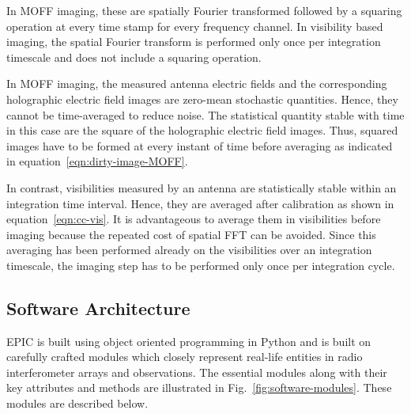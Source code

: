 \documentclass[a4paper,fleqn,usenatbib]{mnras}
\begin{document}
In MOFF imaging, these are spatially Fourier transformed followed by a squaring
operation at every time stamp for every frequency channel. In visibility based 
imaging, the spatial Fourier transform is performed only once per integration 
timescale and does not include a squaring operation.

\par\medskip
{}
\par\medskip
\noindent In MOFF imaging, the measured antenna electric fields and the 
corresponding holographic electric field images are zero-mean stochastic 
quantities. Hence, they cannot be time-averaged to reduce noise. The statistical 
quantity stable with time in this case are the square of the holographic 
electric field images. Thus, squared images have to be formed at every instant 
of time before averaging as indicated in equation~\ref{eqn:dirty-image-MOFF}.

In contrast, visibilities measured by an antenna are statistically stable within
an integration time interval. Hence, they are averaged after calibration as shown
in equation~\ref{eqn:cc-vis}. It is advantageous to average them in visibilities
before imaging because the repeated cost of spatial FFT can be avoided. Since 
this averaging has been performed already on the visibilities over an integration 
timescale, the imaging step has to be performed only once per integration cycle. 

\subsection{Software Architecture}\label{sec:software-modules}

EPIC is built using object oriented programming in Python and is built on
carefully crafted modules which closely represent real-life entities in radio 
interferometer arrays and observations. The essential modules along with their
key attributes and methods are illustrated in Fig.~\ref{fig:software-modules}.
These modules are described below.
\end{document}
